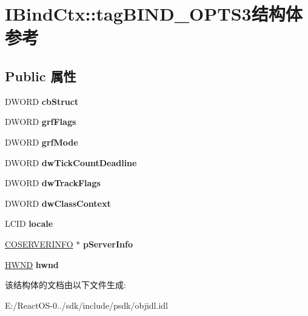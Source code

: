 \hypertarget{struct_i_bind_ctx_1_1tag_b_i_n_d___o_p_t_s3}{}\section{I\+Bind\+Ctx\+:\+:tag\+B\+I\+N\+D\+\_\+\+O\+P\+T\+S3结构体 参考}
\label{struct_i_bind_ctx_1_1tag_b_i_n_d___o_p_t_s3}
\subsection*{Public 属性}
\begin{DoxyCompactItemize}
\item 
\mbox{\label{struct_i_bind_ctx_1_1tag_b_i_n_d___o_p_t_s3_a46a7bb3a6850e7bb92301ffbe08429c3}} 
D\+W\+O\+RD {\bfseries cb\+Struct}
\item 
\mbox{\label{struct_i_bind_ctx_1_1tag_b_i_n_d___o_p_t_s3_a3fa1d62a9f545db878e4c3de1c6413c6}} 
D\+W\+O\+RD {\bfseries grf\+Flags}
\item 
\mbox{\label{struct_i_bind_ctx_1_1tag_b_i_n_d___o_p_t_s3_af2bc17d53528516d5889b48f752facb3}} 
D\+W\+O\+RD {\bfseries grf\+Mode}
\item 
\mbox{\label{struct_i_bind_ctx_1_1tag_b_i_n_d___o_p_t_s3_a36de7ffb2f9b3ae0137034179ca30abc}} 
D\+W\+O\+RD {\bfseries dw\+Tick\+Count\+Deadline}
\item 
\mbox{\label{struct_i_bind_ctx_1_1tag_b_i_n_d___o_p_t_s3_ac18b34b02b0c746b432ee54d2406d1c1}} 
D\+W\+O\+RD {\bfseries dw\+Track\+Flags}
\item 
\mbox{\label{struct_i_bind_ctx_1_1tag_b_i_n_d___o_p_t_s3_a1f32ebfdb0b520958b501df46f5e5b13}} 
D\+W\+O\+RD {\bfseries dw\+Class\+Context}
\item 
\mbox{\label{struct_i_bind_ctx_1_1tag_b_i_n_d___o_p_t_s3_a35e16d7dc4880c24861eae93c8a83a71}} 
L\+C\+ID {\bfseries locale}
\item 
\mbox{\label{struct_i_bind_ctx_1_1tag_b_i_n_d___o_p_t_s3_acd2f598950fd8a1a410c5cf3eb1e234e}} 
\hyperlink{struct___c_o_s_e_r_v_e_r_i_n_f_o}{C\+O\+S\+E\+R\+V\+E\+R\+I\+N\+FO} $\ast$ {\bfseries p\+Server\+Info}
\item 
\mbox{\label{struct_i_bind_ctx_1_1tag_b_i_n_d___o_p_t_s3_a878dfd00c627c46f37f5dffae3df3e66}} 
\hyperlink{interfacevoid}{H\+W\+ND} {\bfseries hwnd}
\end{DoxyCompactItemize}


该结构体的文档由以下文件生成\+:\begin{DoxyCompactItemize}
\item 
E\+:/\+React\+O\+S-\/0../sdk/include/psdk/objidl.\+idl\end{DoxyCompactItemize}

